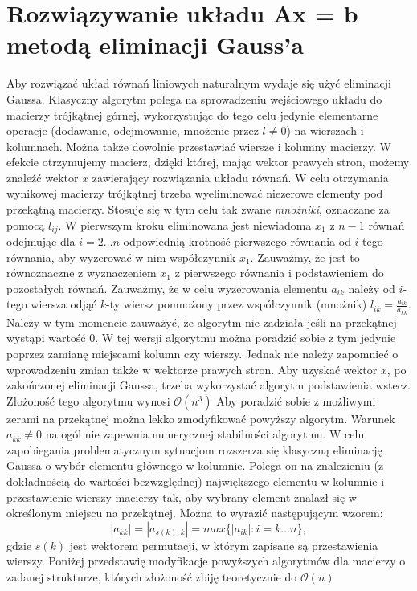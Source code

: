 \documentclass{article}
\begin{document}
\section{Rozwiązywanie układu Ax = b metodą eliminacji Gauss'a}
Aby rozwiązać układ równań liniowych naturalnym wydaje się użyć eliminacji Gaussa. Klasyczny 
algorytm polega na sprowadzeniu wejściowego układu do macierzy 
trójkątnej górnej, wykorzystując do tego celu jedynie elementarne 
operacje (dodawanie, odejmowanie, mnożenie przez $l \neq 0$) na 
wierszach i kolumnach. Można także dowolnie przestawiać wiersze 
i kolumny macierzy. W efekcie otrzymujemy macierz, dzięki której, 
mając wektor prawych stron, możemy znaleźć wektor $x$ zawierający 
rozwiązania układu równań.
\newline
\newline
W celu otrzymania wynikowej macierzy trójkątnej trzeba 
wyeliminować niezerowe elementy pod przekątną macierzy. 
Stosuje się w tym celu tak zwane \textit{mnożniki}, oznaczane za pomocą 
$l_{ij}.$ W pierwszym kroku eliminowana jest niewiadoma $x_1$ z $n-1$ równań 
odejmując dla $i = 2 \ldots n$ odpowiednią krotność pierwszego równania od $i$-tego 
równania, aby wyzerować w nim współczynnik $x_1$. Zauważmy, że jest to równoznaczne z 
wyznaczeniem $x_1$ z pierwszego równania i podstawieniem do pozostałych równań. Zauważmy, 
że w celu wyzerowania elementu $a_{ik}$ należy od $i$-tego wiersza odjąć $k$-ty wiersz 
pomnożony przez współczynnik (mnożnik) $l_{ik} = \frac{a_{ik}}{a_{kk}}.$ Należy w tym momencie 
zauważyć, że algorytm nie zadziała jeśli na przekątnej wystąpi wartość 0. W tej wersji 
algorytmu można poradzić sobie z tym jedynie poprzez zamianę miejscami kolumn czy wierszy. Jednak 
nie należy zapomnieć o wprowadzeniu zmian także w wektorze prawych stron. Aby uzyskać wektor $x$, po 
zakończonej eliminacji Gaussa, trzeba wykorzystać algorytm podstawienia wstecz. 
\newline
\newline
Złożoność tego algorytmu wynosi $\mathcal{O}(n^3)$
\newline
\newline
Aby poradzić sobie z możliwymi zerami na przekątnej można lekko zmodyfikować powyższy 
algorytm. Warunek $a_{kk} \neq 0$ na ogól nie zapewnia numerycznej stabilności algorytmu. W celu 
zapobiegania problematycznym sytuacjom rozszerza się klasyczną eliminację Gaussa o wybór elementu 
głównego w kolumnie. Polega on na znalezieniu (z dokładnością do wartości bezwzględnej) największego 
elementu w kolumnie i przestawienie wierszy macierzy tak, aby wybrany element znalazł się w określonym miejscu 
na przekątnej. Można to wyrazić następującym wzorem:
$$
|a_{kk}| = |a_{s(k),k}| = max\{|a_{ik}| : i = k \ldots n \},
$$
gdzie $s(k)$ jest wektorem permutacji, w którym zapisane są przestawienia wierszy.
\newline
\newline
Poniżej przedstawię modyfikacje powyższych algorytmów dla macierzy o zadanej strukturze, których 
złożoność zbiję teoretycznie do $\mathcal{O}(n)$
\end{document}
